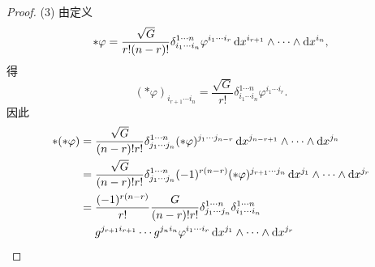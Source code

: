 \begin{proof}
  (3) 由定义
  \[*\varphi = \frac{\sqrt{G}}{r!(n-r)!}\delta_{i_1\cdots i_n}^{1\cdots n}
    \varphi^{i_1\cdots i_r}\mathop{}\!\mathrm{d} x^{i_{r+1}}\wedge\cdots\wedge\mathop{}\!\mathrm{d} x^{i_n},\]
  得
  \[(*\varphi)_{i_{r+1}\cdots i_n} = \frac{\sqrt{G}}{r!}
    \delta_{i_1\cdots i_n}^{1\cdots n}\varphi^{i_1\cdots i_r}.\]
  因此
  \begin{align*}
    *(*\varphi)
    ={} & \frac{\sqrt{G}}{(n-r)!r!}\delta_{j_1\cdots j_n}^{1\cdots n}
      (*\varphi)^{j_1\cdots j_{n-r}} \mathop{}\!\mathrm{d} x^{j_{n-r+1}}\wedge\cdots\wedge\mathop{}\!\mathrm{d} x^{j_n} \\
    ={} & \frac{\sqrt{G}}{(n-r)!r!}\delta_{j_1\cdots j_n}^{1\cdots n}
      (-1)^{r(n-r)} (*\varphi)^{j_{r+1}\cdots j_n} \mathop{}\!\mathrm{d} x^{j_1}\wedge\cdots\wedge\mathop{}\!\mathrm{d} x^{j_r} \\
    ={} & \frac{(-1)^{r(n-r)}}{r!}\frac{G}{(n-r)!r!}
      \delta_{j_1\cdots j_n}^{1\cdots n}\delta_{i_1\cdots i_n}^{1\cdots n} \\
        & g^{j_{r+1}i_{r+1}}\cdots g^{j_ni_n} \varphi^{i_1\cdots i_r}
          \mathop{}\!\mathrm{d} x^{j_1}\wedge\cdots\wedge\mathop{}\!\mathrm{d} x^{j_r}
  \end{align*}
\end{proof}